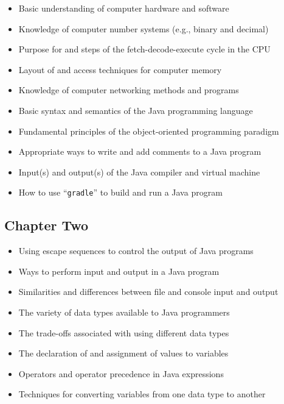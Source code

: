 \documentclass[11pt]{article}
\newcommand{\command}[1]{``\lstinline{#1}''}
\begin{document}
\begin{itemize}

  \itemsep 0in

  \item Basic understanding of computer hardware and software
  \item Knowledge of computer number systems (e.g., binary and decimal)
  \item Purpose for and steps of the fetch-decode-execute cycle in the CPU
  \item Layout of and access techniques for computer memory
  \item Knowledge of computer networking methods and programs
  \item Basic syntax and semantics of the Java programming language
  \item Fundamental principles of the object-oriented programming paradigm
  \item Appropriate ways to write and add comments to a Java program
  \item Input(s) and output(s) of the Java compiler and virtual machine
  \item How to use \command{gradle} to build and run a Java program

\end{itemize}

\subsection*{Chapter Two}

\begin{itemize}

  \itemsep 0in

  \item Using escape sequences to control the output of Java programs
  \item Ways to perform input and output in a Java program
  \item Similarities and differences between file and console input and output
  \item The variety of data types available to Java programmers
  \item The trade-offs associated with using different data types
  \item The declaration of and assignment of values to variables
  \item Operators and operator precedence in Java expressions
  \item Techniques for converting variables from one data type to another

\end{itemize}
\end{document}
